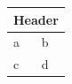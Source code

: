 \documentclass{article}
\begin{document}
\begin{tabular}{|l|l|}
  \hline
  \multicolumn{2}{|c|}{Header} \\
  \hline
  a & b \\
  c & d \\
  \hline
\end{tabular}
\end{document}
